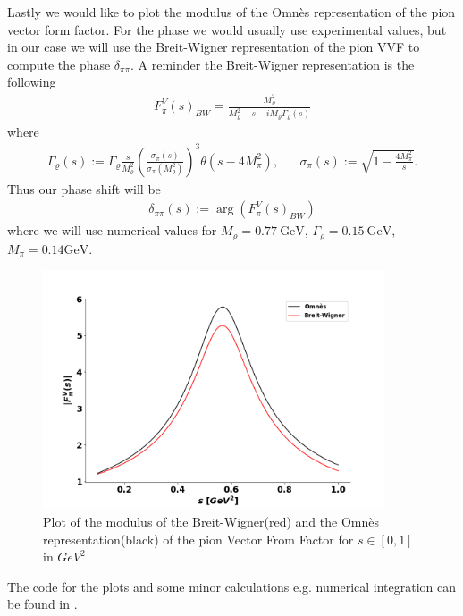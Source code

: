\documentclass[a4paper]{article}
\begin{document}
Lastly we would like to plot the modulus of the Omn\`es representation of the
pion vector form
factor. For the phase we would usually use experimental values, but in our case
we will use the Breit-Wigner representation of the pion VVF to compute the
phase $\delta_{\pi\pi}$. A reminder the Breit-Wigner representation is the
following
\begin{align}
    F^V_\pi(s)_{BW} = \frac{M_\varrho^2}{M_\varrho^2 - s - iM_\varrho
    \Gamma_\varrho(s)}
\end{align}
where
\begin{align}
    \Gamma_\varrho(s) := \Gamma_\varrho\frac{s}{M_\varrho^2} \left(
    \frac{\sigma_\pi(s)}{\sigma_\pi(M_\varrho^2)}
    \right)^3 \theta(s-4M_\pi^2), \;\;\;\;\;\; \sigma_\pi(s) :=
    \sqrt{1-\frac{4M_\pi^2}{s}}.
\end{align}
Thus our phase shift will be
\begin{align}
    \delta_{\pi\pi}(s) := \arg\left(F_\pi^V(s)_{BW}\right)
\end{align}
where we will use numerical values for $M_\varrho = 0.77\ \text{GeV}$,
$\Gamma_\varrho = 0.15\ \text{GeV}$, $M_\pi = 0.14 \text{GeV}$.
\begin{figure}[H]
    \centering
    \includegraphics[width=0.9\textwidth]{./omnes_bw.png}
    \caption{Plot of the modulus of the Breit-Wigner(red) and the Omn\`es
    representation(black) of the pion Vector From Factor for $s \in [0, 1]$ in $GeV^2$}
\end{figure}
The code for the plots and some minor calculations e.g. numerical integration
can be found in \cite{code}.

\nocite{mathe}
\nocite{stoffer}
\nocite{omnes}
\printbibliography
\end{document}
